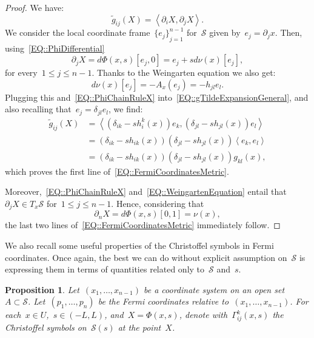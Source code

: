\documentclass[12pt,a4paper]{amsart}
\numberwithin{equation}{section}
\newtheorem{proposition}[theorem]{Proposition}
\theoremstyle{definition}
\theoremstyle{remark}
\newcommand{\dotprod}[2]{\left\langle#1,#2\right\rangle}
\renewcommand{\leq}{\leqslant}
\begin{document}
\begin{appendix}
\begin{proof}
    We have:
    \begin{equation}\label{EQ::gTildeExpansionGeneral}
        \tilde{g}_{ij}(X) = \dotprod{\partial_i X}{\partial_j X}.
    \end{equation}
    We consider the local coordinate frame~${\{e_j\}}_{j=1}^{n-1}$ for~$\mathcal{S}$ given by~$e_j = \partial_j x$. Then, using~\eqref{EQ::PhiDifferential}
    \begin{equation}\label{EQ::PhiChainRuleX}
        \partial_j X = d\Phi(x,s)[e_j, 0] = e_j + s d\nu(x)[e_j],
    \end{equation}
    for every~$1\leq j\leq n-1$. Thanks to the Weingarten equation we also get:
    \begin{equation}\label{EQ::WeingartenEquation}
        d\nu(x)[e_j] = -A_x(e_j) = -h_{jl} e_l.
    \end{equation}
    Plugging this and~\eqref{EQ::PhiChainRuleX} into~\eqref{EQ::gTildeExpansionGeneral}, and also recalling that~$e_j = \delta_{jl}e_l$, we find:
    \begin{align}
        \tilde{g}_{ij}(X)   &= \dotprod{(\delta_{ik}-sh_{i}^{k}(x))e_k}{(\delta_{jl}-sh_{jl}(x))e_l}\\
                            &= (\delta_{ik}-sh_{ik}(x))(\delta_{jl}-sh_{jl}(x)) \dotprod{e_k}{e_l}\\
                            &= (\delta_{ik}-sh_{ik}(x))(\delta_{jl}-sh_{jl}(x))g_{kl}(x),
    \end{align}
    which proves the first line of~\eqref{EQ::FermiCoordinatesMetric}.

    Moreover,~\eqref{EQ::PhiChainRuleX} and~\eqref{EQ::WeingartenEquation} entail that~$\partial_j X \in T_x\mathcal{S}$ for~$1\leq j\leq n-1$. Hence, considering that
    \begin{equation}
        \partial_n X = d\Phi(x,s)[0, 1] = \nu(x),
    \end{equation}
    the last two lines of~\eqref{EQ::FermiCoordinatesMetric} immediately follow.
\end{proof}

We also recall some useful properties of the Christoffel symbols in Fermi coordinates. Once again, the best we can do without explicit assumption on~$\mathcal{S}$ is expressing them in terms of quantities related only to~$\mathcal{S}$ and~$s$.

\begin{proposition}\label{PROP::FermiCoordinatesChristoffelSymbols}
    Let~$(x_1,\dots,x_{n-1})$ be a coordinate system on an open set~$A \subset \mathcal{S}$. Let~$(p_1,\dots,p_n)$ be the Fermi coordinates relative to~$(x_1,\dots,x_{n-1})$. For each~$x \in U$,~$s \in (-L,L)$, and~$X = \Phi(x,s)$, denote with~$\Gamma_{ij}^k(x,s)$ the Christoffel symbols on~$\mathcal{S}(s)$ at the point~$X$.
    

\end{proposition}
\end{appendix}
\end{document}
